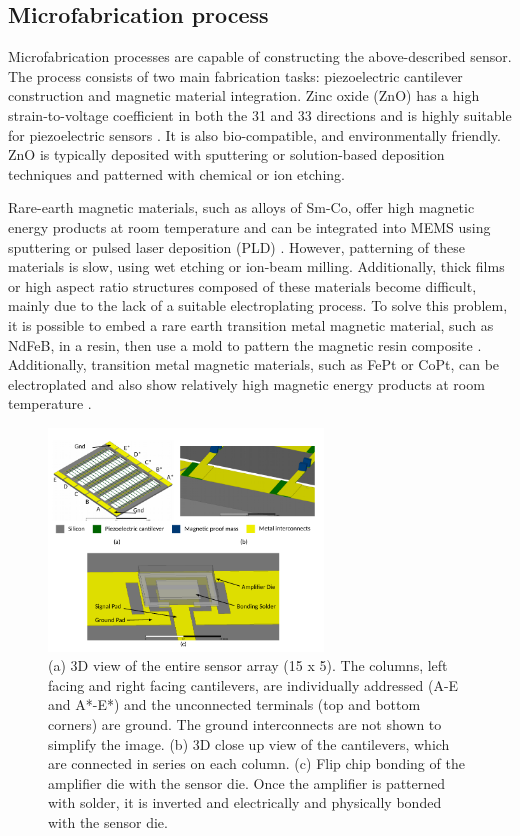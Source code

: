 \subsection{Microfabrication process}
Microfabrication processes are capable of constructing the above-described sensor. The process consists of two main fabrication tasks: piezoelectric cantilever construction and magnetic material integration. Zinc oxide (ZnO) has a high strain-to-voltage coefficient in both the 31 and 33 directions and is highly suitable for piezoelectric sensors \cite{tadigadapa2009piezoelectric}. It is also bio-compatible, and environmentally friendly. ZnO is typically deposited with sputtering or solution-based deposition techniques \cite{znaidi2010sol} and patterned with chemical or ion etching.

Rare-earth magnetic materials, such as alloys of Sm-Co, offer high magnetic energy products at room temperature and can be integrated into MEMS using sputtering or pulsed laser deposition (PLD)  \cite{arnold2009permanent}. However, patterning of these materials is slow, using wet etching or ion-beam milling. Additionally, thick films or high aspect ratio structures composed of these materials become difficult, mainly due to the lack of a suitable electroplating process. To solve this problem, it is possible to embed a rare earth transition metal magnetic material, such as NdFeB, in a resin, then use a mold to pattern the magnetic resin composite \cite{wang2013resin}. Additionally, transition metal magnetic materials, such as FePt or CoPt, can be electroplated and also show relatively high magnetic energy products at room temperature \cite{arnold2009permanent,chin2000permanent}.


\begin{figure}[H]
\centering
\includegraphics[width=0.65\textwidth]{yoon_3d}
\caption{(a) 3D view of the entire sensor array (15 x 5). The columns, left facing and right facing cantilevers, are individually addressed (A-E and A*-E*) and the unconnected terminals (top and bottom corners) are ground. The ground interconnects are not shown to simplify the image. (b) 3D close up view of the cantilevers, which are connected in series on each column. (c) Flip chip bonding of the amplifier die with the sensor die. Once the amplifier is patterned with solder, it is inverted and electrically and physically bonded with the sensor die.}
\label{fig:yoon_3d}
\end{figure}


